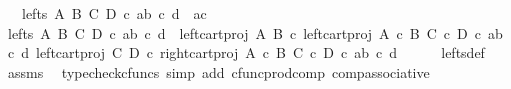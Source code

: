 \begin{isabellebody}
\ \ \ {\isachardoublequoteopen}lefts\ A\ B\ C\ D\ {\isasymcirc}\isactrlsub c\ {\isasymlangle}{\isasymlangle}a{\isacharcomma}{\kern0pt}b{\isasymrangle}{\isacharcomma}{\kern0pt}\ {\isasymlangle}c{\isacharcomma}{\kern0pt}\ d{\isasymrangle}{\isasymrangle}\ {\isacharequal}{\kern0pt}\ {\isasymlangle}a{\isacharcomma}{\kern0pt}c{\isasymrangle}{\isachardoublequoteclose}\isanewline
%
\isadelimproof
%
\endisadelimproof
%
\isatagproof
{}\isamarkupfalse%
\ {\isacharminus}{\kern0pt}\isanewline
\ \ \isamarkupfalse%
\ {\isachardoublequoteopen}lefts\ A\ B\ C\ D\ {\isasymcirc}\isactrlsub c\ {\isasymlangle}{\isasymlangle}a{\isacharcomma}{\kern0pt}b{\isasymrangle}{\isacharcomma}{\kern0pt}\ {\isasymlangle}c{\isacharcomma}{\kern0pt}\ d{\isasymrangle}{\isasymrangle}\ {\isacharequal}{\kern0pt}\ {\isasymlangle}left{\isacharunderscore}{\kern0pt}cart{\isacharunderscore}{\kern0pt}proj\ A\ B\ {\isasymcirc}\isactrlsub c\ left{\isacharunderscore}{\kern0pt}cart{\isacharunderscore}{\kern0pt}proj\ {\isacharparenleft}{\kern0pt}A\ {\isasymtimes}\isactrlsub c\ B{\isacharparenright}{\kern0pt}\ {\isacharparenleft}{\kern0pt}C\ {\isasymtimes}\isactrlsub c\ D{\isacharparenright}{\kern0pt}\ {\isasymcirc}\isactrlsub c\ {\isasymlangle}{\isasymlangle}a{\isacharcomma}{\kern0pt}b{\isasymrangle}{\isacharcomma}{\kern0pt}\ {\isasymlangle}c{\isacharcomma}{\kern0pt}\ d{\isasymrangle}{\isasymrangle}{\isacharcomma}{\kern0pt}\ left{\isacharunderscore}{\kern0pt}cart{\isacharunderscore}{\kern0pt}proj\ C\ D\ {\isasymcirc}\isactrlsub c\ right{\isacharunderscore}{\kern0pt}cart{\isacharunderscore}{\kern0pt}proj\ {\isacharparenleft}{\kern0pt}A\ {\isasymtimes}\isactrlsub c\ B{\isacharparenright}{\kern0pt}\ {\isacharparenleft}{\kern0pt}C\ {\isasymtimes}\isactrlsub c\ D{\isacharparenright}{\kern0pt}\ {\isasymcirc}\isactrlsub c\ {\isasymlangle}{\isasymlangle}a{\isacharcomma}{\kern0pt}b{\isasymrangle}{\isacharcomma}{\kern0pt}\ {\isasymlangle}c{\isacharcomma}{\kern0pt}\ d{\isasymrangle}{\isasymrangle}{\isasymrangle}{\isachardoublequoteclose}\isanewline
\ \ \ \ \isamarkupfalse%
\ lefts{\isacharunderscore}{\kern0pt}def\ \isamarkupfalse%
\ assms\ \isamarkupfalse%
\ {\isacharparenleft}{\kern0pt}typecheck{\isacharunderscore}{\kern0pt}cfuncs{\isacharcomma}{\kern0pt}\ simp\ add{\isacharcolon}{\kern0pt}\ cfunc{\isacharunderscore}{\kern0pt}prod{\isacharunderscore}{\kern0pt}comp\ comp{\isacharunderscore}{\kern0pt}associative{}{\isacharparenright}{\kern0pt}\isanewline
\ \ \isamarkupfalse%
\ \isamarkupfalse%

\end{isabellebody}
